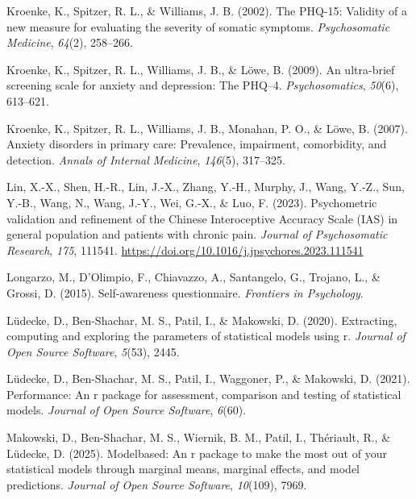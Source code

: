\documentclass[
  jou,
  floatsintext,
  longtable,
  nolmodern,
  notxfonts,
  notimes,
  colorlinks=true,linkcolor=blue,citecolor=blue,urlcolor=blue]{apa7}
\newlength{\cslhangindent}
\newenvironment{CSLReferences}[2] %
 {\begin{list}{}{%
  \setlength{\itemindent}{0pt}
  \setlength{\leftmargin}{0pt}
  \setlength{\parsep}{0pt}
  \ifodd #1
   \setlength{\leftmargin}{\cslhangindent}
   \setlength{\itemindent}{-1\cslhangindent}
  \fi
  \setlength{\itemsep}{#2\baselineskip}}}
 {\end{list}}
\begin{document}
\begin{CSLReferences}{1}{0}
Kroenke, K., Spitzer, R. L., \& Williams, J. B. (2002). The PHQ-15:
Validity of a new measure for evaluating the severity of somatic
symptoms. \emph{Psychosomatic Medicine}, \emph{64}(2), 258--266.

Kroenke, K., Spitzer, R. L., Williams, J. B., \& Löwe, B. (2009). An
ultra-brief screening scale for anxiety and depression: The PHQ--4.
\emph{Psychosomatics}, \emph{50}(6), 613--621.

Kroenke, K., Spitzer, R. L., Williams, J. B., Monahan, P. O., \& Löwe,
B. (2007). Anxiety disorders in primary care: Prevalence, impairment,
comorbidity, and detection. \emph{Annals of Internal Medicine},
\emph{146}(5), 317--325.

Lin, X.-X., Shen, H.-R., Lin, J.-X., Zhang, Y.-H., Murphy, J., Wang,
Y.-Z., Sun, Y.-B., Wang, N., Wang, J.-Y., Wei, G.-X., \& Luo, F. (2023).
Psychometric validation and refinement of the Chinese Interoceptive
Accuracy Scale (IAS) in general population and patients with chronic
pain. \emph{Journal of Psychosomatic Research}, \emph{175}, 111541.
\url{https://doi.org/10.1016/j.jpsychores.2023.111541}

Longarzo, M., D'Olimpio, F., Chiavazzo, A., Santangelo, G., Trojano, L.,
\& Grossi, D. (2015). Self-awareness questionnaire. \emph{Frontiers in
Psychology}.

Lüdecke, D., Ben-Shachar, M. S., Patil, I., \& Makowski, D. (2020).
Extracting, computing and exploring the parameters of statistical models
using r. \emph{Journal of Open Source Software}, \emph{5}(53), 2445.

Lüdecke, D., Ben-Shachar, M. S., Patil, I., Waggoner, P., \& Makowski,
D. (2021). Performance: An r package for assessment, comparison and
testing of statistical models. \emph{Journal of Open Source Software},
\emph{6}(60).

Makowski, D., Ben-Shachar, M. S., Wiernik, B. M., Patil, I., Thériault,
R., \& Lüdecke, D. (2025). Modelbased: An r package to make the most out
of your statistical models through marginal means, marginal effects, and
model predictions. \emph{Journal of Open Source Software},
\emph{10}(109), 7969.


\end{CSLReferences}
\end{document}
